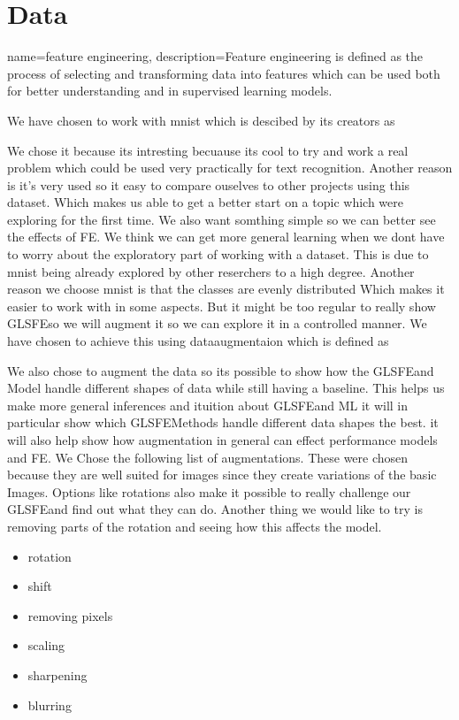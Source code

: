 \section{Data}

{
    name=feature engineering,
    description={Feature engineering is defined as the process of selecting and transforming data into features which can be used both for better understanding and in supervised learning models. }
}

We have chosen to work with mnist which is descibed by its creators as

We chose it because its intresting becuause its cool to try and work a real problem which could be used very practically for text recognition. Another reason is it's very used so it easy to compare ouselves to other projects using this dataset. Which makes us able to get a better start on a topic which were exploring for the first time. We also want somthing simple so we can better see the effects of FE. We think we can get more general learning when we dont have to worry about the exploratory part of working with a dataset. This is due to mnist being already explored by other reserchers to a high degree. Another reason we choose mnist is that the classes are evenly distributed Which makes it easier to work with in some aspects. But it might be too regular to really show GLS{FE}so we will augment it so we can explore it in a controlled manner.
We have chosen to achieve this using dataaugmentaion which is defined as


We also chose to augment the data so its possible to show how the GLS{FE}and Model handle different shapes of data while still having a baseline. This helps us make more general inferences and ituition about GLS{FE}and ML it will in particular show which GLS{FE}Methods handle different data shapes the best. it will also help show how augmentation in general can effect performance models  and FE.
We Chose the following list of augmentations.  These were chosen because they are well suited for images since they create variations of the basic Images. Options like rotations also make it possible to really challenge our GLS{FE}and find out what they can do. Another thing we would like to try is removing parts of the rotation and seeing how this affects the model.

\begin{itemize}
    \item rotation
    \item shift
    \item removing pixels
    \item scaling
    \item sharpening
    \item blurring
  \end{itemize}

 



